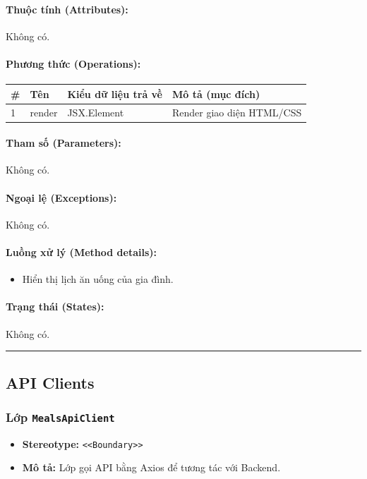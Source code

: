 \documentclass[12pt,a4paper]{article}
\begin{document}
\paragraph{Thuộc tính (Attributes):}
Không có.

\paragraph{Phương thức (Operations):}
\begin{longtable}{|p{0.6cm}|p{3.8cm}|p{2.6cm}|p{6.5cm}|}
\hline
\textbf{\#} & \textbf{Tên} & \textbf{Kiểu dữ liệu trả về} & \textbf{Mô tả (mục đích)} \\ \hline
\endhead
1 & render & JSX.Element & Render giao diện HTML/CSS \\ \hline
\end{longtable}

\paragraph{Tham số (Parameters):}
Không có.

\paragraph{Ngoại lệ (Exceptions):}
Không có.

\paragraph{Luồng xử lý (Method details):}
\begin{itemize}[leftmargin=*]
    \item Hiển thị lịch ăn uống của gia đình.
\end{itemize}


\paragraph{Trạng thái (States):}
Không có.

\vskip 0.5cm
\noindent\rule{\textwidth}{0.5pt}
\vskip 0.5cm

\subsection{API Clients}

\subsubsection{Lớp \texttt{MealsApiClient}}
\begin{itemize}[leftmargin=*]
    \item \textbf{Stereotype:} \texttt{\textless{}\textless{}Boundary\textgreater{}\textgreater{}}
    \item \textbf{Mô tả:} Lớp gọi API bằng Axios để tương tác với Backend.
\end{itemize}
\end{document}
